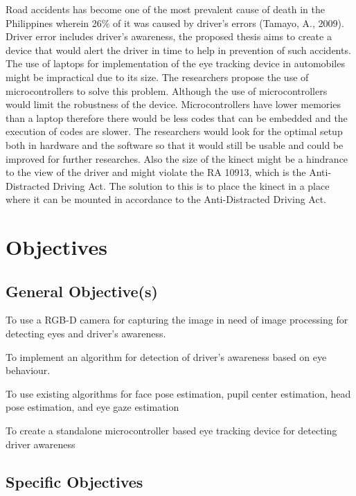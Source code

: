Road accidents has become one of the most prevalent cause of death in the Philippines wherein 26\% of it was caused by driver’s errors (Tamayo, A., 2009). Driver error includes driver’s awareness, the proposed thesis aims to create a device that would alert the driver in time to help in prevention of such accidents.
The use of laptops for implementation of the eye tracking device in automobiles might be impractical due to its size. The researchers propose the use of microcontrollers to solve this problem. Although the use of microcontrollers would limit the robustness of the device. Microcontrollers have lower memories than a laptop therefore there would be less codes that can be embedded and the execution of codes are slower. The researchers would look for the optimal setup both in hardware and the software so that it would still be usable and could be improved for further researches.
Also the size of the kinect might be a hindrance to the view of the driver and might violate the RA 10913, which is the Anti-Distracted Driving Act. The solution to this is to place the kinect in a place where it can be mounted in accordance to the Anti-Distracted Driving Act.



\section{Objectives}


\subsection{General Objective(s)}
To use a RGB-D camera for capturing the image in need of image processing for detecting eyes and driver’s awareness.

To implement an algorithm for detection of driver’s awareness based on eye behaviour.

To use existing algorithms for face pose estimation, pupil center estimation, head pose estimation, and eye gaze estimation

To create a standalone microcontroller based eye tracking device for detecting driver awareness


\subsection{Specific Objectives}

